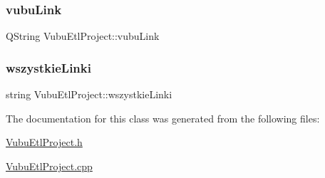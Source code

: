 \mbox{\label{class_vubu_etl_project_a098af5530f5fec86634d06cd704b394b}} 
\subsubsection{\texorpdfstring{vubu\+Link}{vubuLink}}
{\footnotesize\ttfamily Q\+String Vubu\+Etl\+Project\+::vubu\+Link}

\mbox{\label{class_vubu_etl_project_a0d4047ff91f3134c7eb7addff54373a5}} 
\subsubsection{\texorpdfstring{wszystkie\+Linki}{wszystkieLinki}}
{\footnotesize\ttfamily string Vubu\+Etl\+Project\+::wszystkie\+Linki\hspace{0.3cm}{\ttfamily [private]}}



The documentation for this class was generated from the following files\+:\begin{DoxyCompactItemize}
\item 
\mbox{\hyperlink{_vubu_etl_project_8h}{Vubu\+Etl\+Project.\+h}}\item 
\mbox{\hyperlink{_vubu_etl_project_8cpp}{Vubu\+Etl\+Project.\+cpp}}\end{DoxyCompactItemize}
